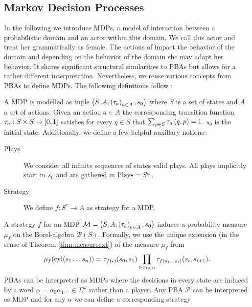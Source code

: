 \subsection{Markov Decision Processes}
In the following we introduce \acp{MDP}, a model of interaction between a 
probabilistic domain and an actor within this domain. We call this actor \eve{} 
and treat her grammatically as female. The actions of \eve{} impact the 
behavior of the domain and depending on the behavior of the domain she
may adapt her behavior. It shares significant structural similarities to 
\acp{PBA} but allows for a rather different interpretation. Nevertheless, we
reuse various concepts from \acp{PBA} to define \acp{MDP}. The following 
definitions follow \cite{RandAutoInfTrees}:
\begin{definition}
  A \acl*{MDP} is modelled as tuple
  $\left(S, A, \left(\tau_{a}\right)_{a\in A}, s_{0}\right)$ where $S$ is a set of states
  and $A$ a set of actions. Given an action $a\in A$ the corresponding
  transition function $\tau_{a}:S\times S\rightarrow \left[0,1\right]$ satisfies
  for every $q\in S$ that $\sum_{p\in S}\tau_{a}\left(q,p\right) = 1$.
  $s_{0}$ is the initial state. Additionally, we define a few helpful
  auxillary notions:
  \begin{description}
    \item [Plays] We consider all infinite sequences of states
      valid plays. All plays implicitly start in $s_{0}$ and are gathered in
      $\operatorname{Plays} = S^{\omega}$.
    \item [Strategy] We define $f:S^{*}\rightarrow A$ as strategy for
      a \ac{MDP}. 
  \end{description}
  \label{def:mdp}
\end{definition}
A strategy $f$ for an \ac{MDP} $\mathcal{M} = \left(S, A, 
\left(\tau_{a}\right)_{a\in A}, s_{0}\right)$ induces a probability measure $\mu_{f}$ on 
the Borel-algebra $\mathcal{B}(S)$. Formally, we use the unique extension (in 
the sense of Theorem \ref{thm:measureext}) of the measure $\mu_{f}$ from
\begin{equation*}
  \mu_{f}(\operatorname{cyl}(s_{1}\dots s_{n})) = \tau_{f(\epsilon)}(s_{0}, s_{1})
    \prod_{1\leq i < n}\tau_{f(s_{1}\dots s_{i})}(s_{i}, s_{i+1}).
\end{equation*}
\acp{PBA} can be interpreted as \acp{MDP} where the decisions in every state
are induced by a word $\alpha = \alpha_{0}\alpha_{1}\dots\in\Sigma^{\omega}$
rather than a player. Any \ac{PBA} $\mathcal{P}$ can be interpreted as \ac{MDP}
and for any $\alpha$ we can define a corresponding strategy
